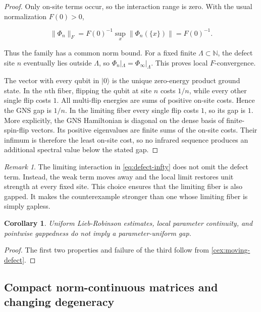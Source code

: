 \documentclass[12pt]{article}
\newtheorem{corollary}[theorem]{Corollary}
\theoremstyle{definition}
\theoremstyle{remark}
\newtheorem{remark}[theorem]{Remark}
\begin{document}
\begin{proof}
Only on-site terms occur, so the interaction range is zero.  With the usual
normalization $F(0)>0$,

\begin{equation}
  \|\Phi_n\|_F
  =F(0)^{-1}\sup_x\|\Phi_n(\{x\})\|
  =F(0)^{-1}.
\end{equation}

Thus the family has a common norm bound.  For a fixed finite
$\Lambda\subset\mathbb N$, the defect site $n$ eventually lies outside
$\Lambda$, so $\Phi_n|_\Lambda=\Phi_\infty|_\Lambda$.  This proves local
$F$-convergence.

The vector with every qubit in $|0\rangle$ is the unique zero-energy product
ground state.  In the $n$th fiber, flipping the qubit at site $n$ costs
$1/n$, while every other single flip costs $1$.  All multi-flip energies are
sums of positive on-site costs.  Hence the GNS gap is $1/n$.  In the limiting
fiber every single flip costs $1$, so its gap is $1$.
More explicitly, the GNS Hamiltonian is diagonal on the dense basis of
finite-spin-flip vectors.  Its positive eigenvalues are finite sums of the
on-site costs.  Their infimum is therefore the least on-site cost, so no
infrared sequence produces an additional spectral value below the stated
gap.
\end{proof}

\begin{remark}
The limiting interaction in \cref{eq:defect-infty} does not omit the defect
term.  Instead, the weak term moves away and the local limit restores unit
strength at every fixed site.  This choice ensures that the limiting fiber is
also gapped.  It makes the counterexample stronger than one whose limiting
fiber is simply gapless.
\end{remark}

\begin{corollary}
Uniform Lieb-Robinson estimates, local parameter continuity, and pointwise
gappedness do not imply a parameter-uniform gap.
\end{corollary}

\begin{proof}
The first two properties and failure of the third follow from
\cref{cex:moving-defect}.
\end{proof}

\subsection{Compact norm-continuous matrices and changing degeneracy}
\end{document}

